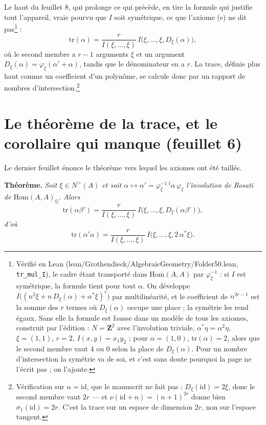 \documentclass[11pt,a4paper]{article}
\begin{document}
Le haut du feuillet 8, qui prolonge ce qui précède, en tire la formule qui
justifie tout l'appareil, vraie pourvu que $I$ soit symétrique, ce que
l'axiome (e) ne dit pas\footnote{Vérifié en Lean
(lean/Grothendieck/AlgebraicGeometry/Folder50.lean, \texttt{tr\_mul\_I}), le cadre étant
transporté dans $\mathrm{Hom}(A,A)$ par $\varphi_{\xi}^{-1}$ : si $I$ est
symétrique, la formule tient pour tout $\alpha$. On développe $I\bigl((n^{2}\xi
+ n\,D_{\xi}(\alpha) + \alpha^{*}\xi)^{r}\bigr)$ par multilinéarité, et le
coefficient de $n^{2r-1}$ est la somme des $r$ termes où $D_{\xi}(\alpha)$
occupe une place ; la symétrie les rend égaux. Sans elle la formule est fausse
dans un modèle de tous les axiomes, construit par l'édition : $N = \mathbf{Z}^{2}$
avec l'involution triviale, $\alpha^{*}\eta = \alpha^{2}\eta$, $\xi = (1,1)$,
$r = 2$, $I(x, y) = x_{1}y_{2}$ ; pour $\alpha = (1, 0)$, $\mathrm{tr}(\alpha) =
2$, alors que le second membre vaut $4$ ou $0$ selon la place de
$D_{\xi}(\alpha)$. Pour un nombre d'intersection la symétrie va de soi, et
c'est sans doute pourquoi la page ne l'écrit pas ; on l'ajoute.} :
\[
  \mathrm{tr}(\alpha) = \frac{r}{I(\xi, \ldots, \xi)}\,
  I\bigl(\xi, \ldots, \xi, D_{\xi}(\alpha)\bigr),
\]
où le second membre a $r-1$ arguments $\xi$ et un argument $D_{\xi}(\alpha) =
\varphi_{\xi}(\alpha' + \alpha)$, tandis que le dénominateur en a $r$. La trace,
définie plus haut comme un coefficient d'un polynôme, se calcule donc par un
rapport de nombres d'intersection.\footnote{Vérification sur $\alpha =
\mathrm{id}$, que le manuscrit ne fait pas : $D_{\xi}(\mathrm{id}) = 2\xi$,
donc le second membre vaut $2r$ — et $\nu(\mathrm{id} + n) = (n+1)^{2r}$ donne
bien $\sigma_{1}(\mathrm{id}) = 2r$. C'est la trace sur un espace de dimension
$2r$, non sur l'espace tangent.}

\section*{Le théorème de la trace, et le corollaire qui manque (feuillet 6)}

Le dernier feuillet énonce le théorème vers lequel les axiomes ont été taillés.

\textbf{Théorème.} \emph{Soit $\xi \in N^{>}(A)$ et soit $\alpha \mapsto
\alpha' = \varphi_{\xi}^{-1}\,{}^{t}\alpha\,\varphi_{\xi}$ l'involution de
Rosati de $\mathrm{Hom}(A,A)_{\mathbb{Q}}$. Alors}
\[
  \mathrm{tr}(\alpha\beta') = \frac{r}{I(\xi, \ldots, \xi)}\,
  I\bigl(\xi, \ldots, \xi, D_{\xi}(\alpha\beta')\bigr),
\]
\emph{d'où}
\[
  \mathrm{tr}(\alpha'\alpha) = \frac{r}{I(\xi, \ldots, \xi)}\,
  I\bigl(\xi, \ldots, \xi, 2\,\alpha^{*}\xi\bigr).
\]
\end{document}
